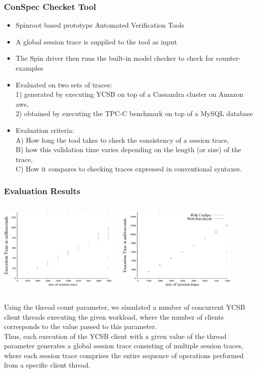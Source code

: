 \documentclass{beamer}
\begin{document}
\begin{frame}
\frametitle{ConSpec Checket Tool}
\begin{itemize}
	\item Spinroot based prototype Automated Verification Tools
 \item A global session trace is supplied to the tool as input
\item The Spin driver then runs the built-in model checker to check for counter-examples
\item Evaluated on two sets of traces: \\
1) generated by executing YCSB on top of a Cassandra cluster on Amazon aws,  \\
2)  obtained by executing the TPC-C benchmark on top of a MySQL database
\item Evaluation criteria: \\
A) How long the tool takes to check the consistency of a session trace, \\
B) how this validation time varies depending on the length (or size) of the trace, \\
C) How it compares to checking traces expressed in conventional syntaxes.
\end{itemize}
	
\end{frame}

\begin{frame}
\frametitle{Evaluation Results}

\begin{columns}
	
	\includegraphics[height=4cm]{conspecYCSBvarhist.eps}
	
	\includegraphics[height=4cm]{conspecTPCCvarhist.eps}
\end{columns}
Using the thread count parameter, we simulated a number of concurrent YCSB client threads executing the given workload,  where the number of clients corresponds to the value passed to this parameter.\\
Thus, each execution of the YCSB client with a given value of the thread parameter generates a global session trace consisting of multiple session traces, where each session trace comprises the entire sequence of operations performed from a specific client thread.

\end{frame}
\end{document}

